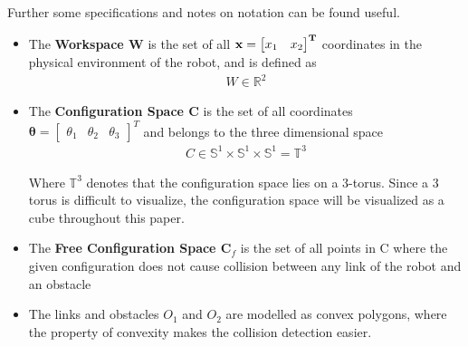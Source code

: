 Further some specifications and notes on notation can be found useful. 
\begin{itemize} 

 \item The \textbf{Workspace W} is the set of all $\bf x = \begin{bmatrix} x_1 & x_2  \end{bmatrix}^T$ coordinates in the physical environment of the robot, and is defined as
\begin{align}
\label{eq:}
 W \in \mathbb{R}^2
 \end{align}

\item The \textbf{Configuration Space C} is the set of all  coordinates $\boldsymbol{ \theta } =  \begin{bmatrix} \theta_1 & \theta_2 & \theta_3  \end{bmatrix}^T$  and belongs to the three dimensional space 
\begin{align}
\label{eq:}
 C \in \mathbb{S}^1 \times \mathbb{S}^1 \times\mathbb{S}^1 = \mathbb{T}^3 
 \end{align}

Where $ \mathbb{T}^3 $ denotes that the configuration space lies on a 3-torus. Since a 3 torus is difficult to visualize, the configuration space will be visualized as a cube throughout this paper.

\item The \textbf{Free Configuration Space $ \mathbf C_f$} is the set of all points in C where the given configuration does not cause collision between any link of the robot and an obstacle

\item The links and obstacles $O_1 $ and $O_2$ are modelled as convex polygons, where the property of convexity makes the collision detection easier.

 \end{itemize}




